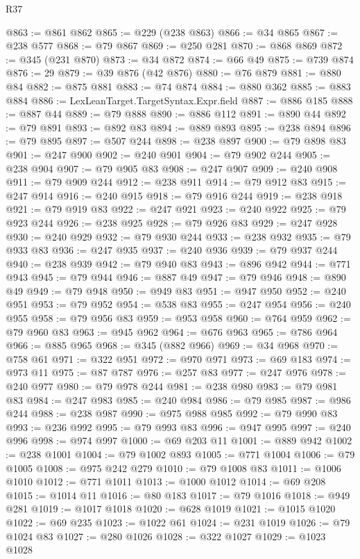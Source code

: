 \begin{lexlean}{R37}
\begin{coremodule}
@863 := @861 @862
@865 := @229 (@238 @863)
@866 := @34 @865
@867 := @238 @577
@868 := @79 @867
@869 := @250 @281
@870 := @868 @869
@872 := @345 (@231 @870)
@873 := @34 @872
@874 := @66 @49
@875 := @739 @874
@876 := 29
@879 := @39 @876 (@42 @876)
@880 := @76 @879
@881 := @880 @84
@882 := @875 @881
@883 := @74 @874
@884 := @880 @362
@885 := @883 @884
@886 := LexLeanTarget.TargetSyntax.Expr.field
@887 := @886 @185
@888 := @887 @44
@889 := @79 @888
@890 := @886 @112
@891 := @890 @44
@892 := @79 @891
@893 := @892 @83
@894 := @889 @893
@895 := @238 @894
@896 := @79 @895
@897 := @507 @244
@898 := @238 @897
@900 := @79 @898 @83
@901 := @247 @900
@902 := @240 @901
@904 := @79 @902 @244
@905 := @238 @904
@907 := @79 @905 @83
@908 := @247 @907
@909 := @240 @908
@911 := @79 @909 @244
@912 := @238 @911
@914 := @79 @912 @83
@915 := @247 @914
@916 := @240 @915
@918 := @79 @916 @244
@919 := @238 @918
@921 := @79 @919 @83
@922 := @247 @921
@923 := @240 @922
@925 := @79 @923 @244
@926 := @238 @925
@928 := @79 @926 @83
@929 := @247 @928
@930 := @240 @929
@932 := @79 @930 @244
@933 := @238 @932
@935 := @79 @933 @83
@936 := @247 @935
@937 := @240 @936
@939 := @79 @937 @244
@940 := @238 @939
@942 := @79 @940 @83
@943 := @896 @942
@944 := @771 @943
@945 := @79 @944
@946 := @887 @49
@947 := @79 @946
@948 := @890 @49
@949 := @79 @948
@950 := @949 @83
@951 := @947 @950
@952 := @240 @951
@953 := @79 @952
@954 := @538 @83
@955 := @247 @954
@956 := @240 @955
@958 := @79 @956 @83
@959 := @953 @958
@960 := @764 @959
@962 := @79 @960 @83
@963 := @945 @962
@964 := @676 @963
@965 := @786 @964
@966 := @885 @965
@968 := @345 (@882 @966)
@969 := @34 @968
@970 := @758 @61
@971 := @322 @951
@972 := @970 @971
@973 := @69 @183
@974 := @973 @11
@975 := @87 @787
@976 := @257 @83
@977 := @247 @976
@978 := @240 @977
@980 := @79 @978 @244
@981 := @238 @980
@983 := @79 @981 @83
@984 := @247 @983
@985 := @240 @984
@986 := @79 @985
@987 := @986 @244
@988 := @238 @987
@990 := @975 @988 @985
@992 := @79 @990 @83
@993 := @236 @992
@995 := @79 @993 @83
@996 := @947 @995
@997 := @240 @996
@998 := @974 @997
@1000 := @69 @203 @11
@1001 := @889 @942
@1002 := @238 @1001
@1004 := @79 @1002 @893
@1005 := @771 @1004
@1006 := @79 @1005
@1008 := @975 @242 @279
@1010 := @79 @1008 @83
@1011 := @1006 @1010
@1012 := @771 @1011
@1013 := @1000 @1012
@1014 := @69 @208
@1015 := @1014 @11
@1016 := @80 @183
@1017 := @79 @1016
@1018 := @949 @281
@1019 := @1017 @1018
@1020 := @628 @1019
@1021 := @1015 @1020
@1022 := @69 @235
@1023 := @1022 @61
@1024 := @231 @1019
@1026 := @79 @1024 @83
@1027 := @280 @1026
@1028 := @322 @1027
@1029 := @1023 @1028

\end{coremodule}
\end{lexlean}

